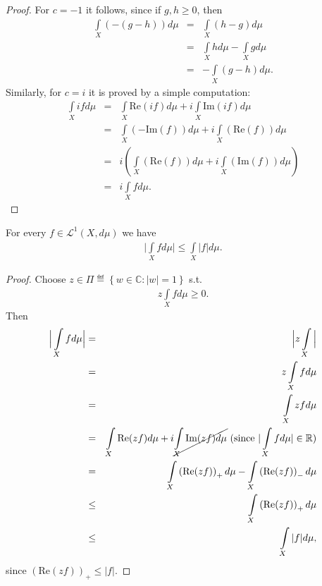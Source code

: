\begin{proof}
    For \(c=-1\) it follows, since if \(g,h\geq0\), then
    \begin{eqnarray*}
        \int\limits_{X}\left( -(g-h) \right)d\mu &=& \int\limits_{X}\left( h-g \right)d\mu \\
        &=& \int\limits_{X} h d\mu - \int\limits_{X} gd\mu \\
        &=& - \int\limits_{X}\left( g- h \right)d\mu.
    \end{eqnarray*}
    Similarly, for \(c=i\) it is proved by a simple computation:
    \begin{eqnarray*}
        \int\limits_{X} i fd\mu &=& \int\limits_{X} \text{Re}(if)d\mu + i\int\limits_{X}\text{Im}(if)d\mu \\
        &=& \int\limits_{X}\left( -\text{Im}(f) \right)d\mu + i \int\limits_{X} \left( \text{Re}(f) \right)d\mu \\
        &=& i\left( \int\limits_{X}\left( \text{Re}(f) \right) d\mu + i\int\limits_{X} \left( \text{Im}(f) \right)d\mu\right) \\
        &=& i\int\limits_{X} fd\mu.
    \end{eqnarray*}
\end{proof}
\begin{prop}
    For every \(f\in \mathcal{L}^{1}(X,d\mu)\) we have
    \begin{align*}
        \Big|\int\limits_{X}fd\mu\Big| \leq \int\limits_{X}|f|d\mu.
    \end{align*}
\end{prop}
\begin{proof}
    Choose \(z\in \Pi\eqdef \left\{ w\in\mathbb{C} : |w|=1 \right\}\) s.t.
    \begin{align*}
        z\int\limits_{X}fd\mu \geq 0.
    \end{align*}
    Then
    \begin{eqnarray*}
        \Big|\int\limits_{X} fd\mu \Big| &=& \Big|z\int\limits_{X}\Big| \\
        &=& z \int\limits_{X}fd\mu \\
        &=& \int\limits_{X}zfd\mu \\
        &=& \int\limits_{X}\text{Re}(zf)d\mu + i \cancel{\int\limits_{X}\text{Im}(zf)d\mu} \ (\text{since }|\int\limits_{X}fd\mu|\in\mathbb{R}) \\
        &=& \int\limits_{X}\left(\text{Re}(zf)\right)_{+}d\mu - \int\limits_{X}\left(\text{Re}(zf)\right)_{-}d\mu \\
        &\leq& \int\limits_{X}\left(\text{Re}(zf)\right)_{+}d\mu \\
        &\leq& \int\limits_{X}|f|d\mu,
    \end{eqnarray*}
    since \(\left( \text{Re}(zf) \right)_{+} \leq |f|\).
\end{proof}